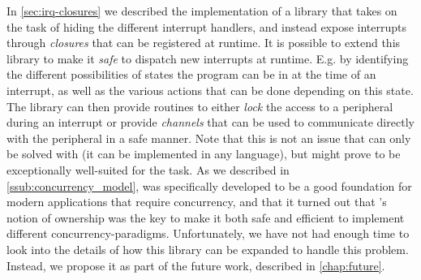 In \autoref{sec:irq-closures} we described the implementation of a library that takes on the task of hiding the different interrupt handlers, and instead expose interrupts through \emph{closures} that can be registered at runtime.
It is possible to extend this library to make it \emph{safe} to dispatch new interrupts at runtime.
E.g. by identifying the different possibilities of states the program can be in at the time of an interrupt, as well as the various actions that can be done depending on this state.
The library can then provide routines to either \emph{lock} the access to a peripheral during an interrupt or provide \emph{channels} that can be used to communicate directly with the peripheral in a safe manner.
Note that this is not an issue that can only be solved with {\rust} (it can be implemented in any language), but {\rust} might prove to be exceptionally well-suited for the task.
As we described in \autoref{ssub:concurrency_model}, {\rust} was specifically developed to be a good foundation for modern applications that require concurrency, and that it turned out that {\rust}'s notion of ownership was the key to make it both safe and efficient to implement different concurrency-paradigms.
Unfortunately, we have not had enough time to look into the details of how this library can be expanded to handle this problem.
Instead, we propose it as part of the future work, described in \autoref{chap:future}.
